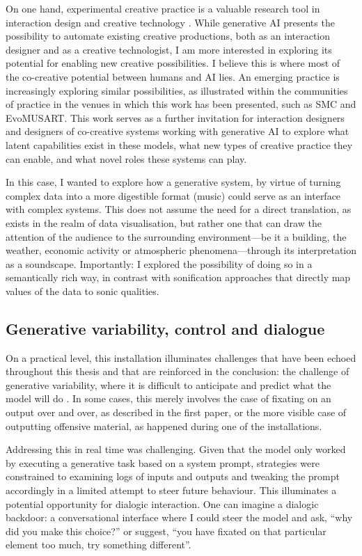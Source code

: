 On one hand, experimental creative practice is a valuable research tool in interaction design \cite{Candy2019-vg, Vear2021-cx} and creative technology \cite{Colton2012-jc, Cohen1995-wt, Cope2000-cq, Reichardt1968-eo}. While generative AI presents the possibility to automate existing creative productions, both as an interaction designer and as a creative technologist, I am more interested in exploring its potential for enabling new creative possibilities. I believe this is where most of the co-creative potential between humans and AI lies. An emerging practice is increasingly exploring similar possibilities, as illustrated within the communities of practice in the venues in which this work has been presented, such as SMC and EvoMUSART. This work serves as a further invitation for interaction designers and designers of co-creative systems working with generative AI to explore what latent capabilities exist in these models, what new types of creative practice they can enable, and what novel roles these systems can play.

In this case, I wanted to explore how a generative system, by virtue of turning complex data into a more digestible format (music) could serve as an interface with complex systems. This does not assume the need for a direct translation, as exists in the realm of data visualisation, but rather one that can draw the attention of the audience to the surrounding environment—be it a building, the weather, economic activity or atmospheric phenomena—through its interpretation as a soundscape. Importantly: I explored the possibility of doing so in a semantically rich way, in contrast with sonification approaches that directly map values of the data to sonic qualities. 

\subsection{Generative variability, control and dialogue}

On a practical level, this installation illuminates challenges that have been echoed throughout this thesis and that are reinforced in the conclusion: the challenge of generative variability, where it is difficult to anticipate and predict what the model will do \cite{Weisz2024-io}. In some cases, this merely involves the case of fixating on an output over and over, as described in the first paper, or the more visible case of outputting offensive material, as happened during one of the installations.

Addressing this in real time was challenging. Given that the model only worked by executing a generative task based on a system prompt, strategies were constrained to examining logs of inputs and outputs and tweaking the prompt accordingly in a limited attempt to steer future behaviour. This illuminates a potential opportunity for dialogic interaction. One can imagine a dialogic backdoor: a conversational interface where I could steer the model and ask, “why did you make this choice?” or suggest, “you have fixated on that particular element too much, try something different”.

